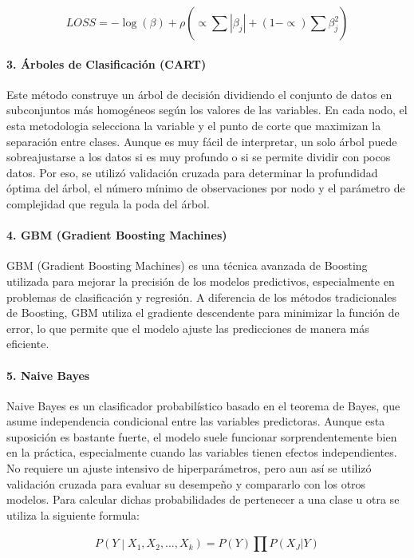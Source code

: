 \documentclass[12pt,a4paper,onecolumn]{article}
\begin{document}
$$LOSS = - \log(\beta) + \rho( \propto \sum_{}^{}\left| \beta_{j} \right| + (1 - \propto )\sum_{}^{}\beta_{j}^{2})$$

\paragraph{3. Árboles de Clasificación (CART)}

Este método construye un árbol de decisión dividiendo el conjunto de datos en subconjuntos más homogéneos según los valores de las variables. En cada nodo, el esta metodologia selecciona la variable y el punto de corte que maximizan la separación entre clases. Aunque es muy fácil de interpretar, un solo árbol puede sobreajustarse a los datos si es muy profundo o si se permite dividir con pocos datos. Por eso, se utilizó validación cruzada para determinar la profundidad óptima del árbol, el número mínimo de observaciones por nodo y el parámetro de complejidad que regula la poda del árbol.

\paragraph{4. GBM (Gradient Boosting Machines)}

GBM (Gradient Boosting Machines) es una técnica avanzada de Boosting utilizada para mejorar la precisión de los modelos predictivos, especialmente en problemas de clasificación y regresión. A diferencia de los métodos tradicionales de Boosting, GBM utiliza el gradiente descendente para minimizar la función de error, lo que permite que el modelo ajuste las predicciones de manera más eficiente.

\paragraph{5. Naive Bayes}

Naive Bayes es un clasificador probabilístico basado en el teorema de Bayes, que asume independencia condicional entre las variables predictoras. Aunque esta suposición es bastante fuerte, el modelo suele funcionar sorprendentemente bien en la práctica, especialmente cuando las variables tienen efectos independientes. No requiere un ajuste intensivo de hiperparámetros, pero aun así se utilizó validación cruzada para evaluar su desempeño y compararlo con los otros modelos. Para calcular dichas probabilidades de pertenecer a una clase u otra se utiliza la siguiente formula:

$$P\left( Y \middle| X_{1},X_{2},\ldots,X_{k} \right) = P(Y)\prod_{}^{}{P(X_{J}|Y)}$$
\end{document}

